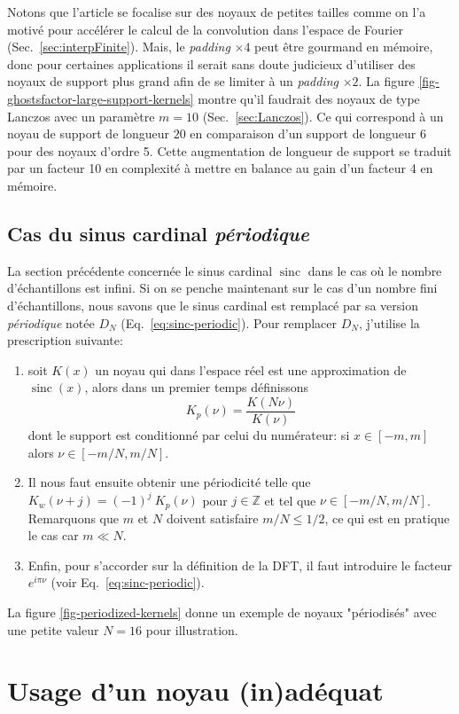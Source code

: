\documentclass[11pt,twoside]{article}
\DeclareMathOperator{\sinc}{sinc}
\begin{document}
Notons que l'article se focalise sur des noyaux de petites tailles comme on l'a motivé pour accélérer le calcul de la convolution dans l'espace de Fourier (Sec.~\ref{sec:interpFinite}). Mais, le \textit{padding} $\times 4$ peut être gourmand en mémoire, donc pour certaines applications il serait sans doute judicieux d'utiliser des noyaux de support plus grand afin de se limiter à un \textit{padding} $\times 2$. La figure \ref{fig-ghostsfactor-large-support-kernels} montre qu'il faudrait des noyaux de type Lanczos avec un paramètre $m=10$ (Sec.~\ref{sec:Lanczos}). Ce qui correspond à un noyau de support de longueur $20$ en comparaison d'un support de longueur $6$ pour des noyaux d'ordre 5. Cette augmentation de longueur de support se traduit par un facteur 10 en complexité à mettre en balance au gain d'un facteur 4 en mémoire.
%
\subsection{Cas du sinus cardinal \textit{périodique}}
\label{sec:noyaux-periodises}
%
La section précédente concernée le sinus cardinal $\sinc$ dans le cas où le nombre d'échantillons est infini. Si on se penche maintenant sur le  cas d'un nombre fini d'échantillons, nous savons que le  sinus cardinal est remplacé par sa version \textit{périodique} notée $D_N$ (Eq.~\ref{eq:sinc-periodic}). Pour remplacer $D_N$, j'utilise  la prescription suivante:
\begin{enumerate}
\item soit $K(x)$ un noyau qui dans l'espace réel est une approximation de $\sinc(x)$, alors dans un premier temps définissons
\begin{equation}
K_p(\nu) = \frac{K(N \nu)}{K(\nu)}
\end{equation}
dont le support est conditionné par celui du numérateur: si $x\in[-m,m]$ alors $\nu\in[-m/N,m/N]$.
\item Il nous faut ensuite obtenir une périodicité telle que $K_w(\nu+j) = (-1)^j\  K_p(\nu)$ pour $j\in\mathbb{Z}$ et tel que $\nu\in[-m/N,m/N]$. Remarquons que $m$ et $N$ doivent satisfaire $m/N\leq 1/2$, ce qui est en pratique le cas car $m\ll N$.    
\item Enfin, pour s'accorder sur la définition de la DFT, il faut introduire le facteur $e^{i \pi \nu}$ (voir Eq.~\ref{eq:sinc-periodic}).
\end{enumerate}
La figure \ref{fig-periodized-kernels} donne un exemple de noyaux "périodisés" avec une petite valeur $N=16$ pour illustration.
%
\section{Usage d'un noyau (in)adéquat}
\label{sec:cas-etude}
%
\end{document}
